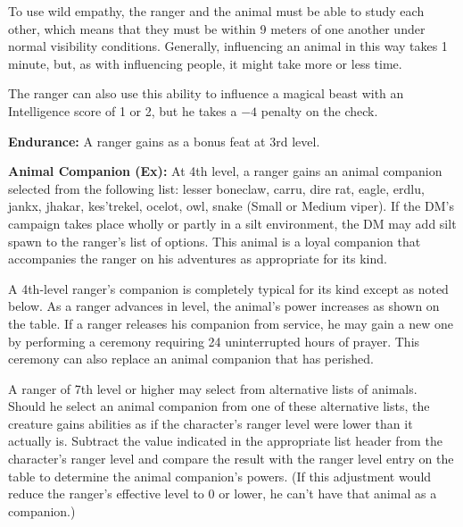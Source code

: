 To use wild empathy, the ranger and the animal must be able to study each other, which means that they must be within 9 meters of one another under normal visibility conditions. Generally, influencing an animal in this way takes 1 minute, but, as with influencing people, it might take more or less time.

The ranger can also use this ability to influence a magical beast with an Intelligence score of 1 or 2, but he takes a $-4$ penalty on the check.


\textbf{Endurance:} A ranger gains  as a bonus feat at 3rd level.


\textbf{Animal Companion (Ex):} At 4th level, a ranger gains an animal companion selected from the following list: lesser boneclaw, carru, dire rat, eagle, erdlu, jankx, jhakar, kes'trekel, ocelot, owl, snake (Small or Medium viper). If the DM's campaign takes place wholly or partly in a silt environment, the DM may add silt spawn to the ranger's list of options. This animal is a loyal companion that accompanies the ranger on his adventures as appropriate for its kind. 

A 4th-level ranger's companion is completely typical for its kind except as noted below. As a ranger advances in level, the animal's power increases as shown on the table. If a ranger releases his companion from service, he may gain a new one by performing a ceremony requiring 24 uninterrupted hours of prayer. This ceremony can also replace an animal companion that has perished.

A ranger of 7th level or higher may select from alternative lists of animals. Should he select an animal companion from one of these alternative lists, the creature gains abilities as if the character's ranger level were lower than it actually is. Subtract the value indicated in the appropriate list header from the character's ranger level and compare the result with the ranger level entry on the table to determine the animal companion's powers. (If this adjustment would reduce the ranger's effective level to 0 or lower, he can't have that animal as a companion.)




